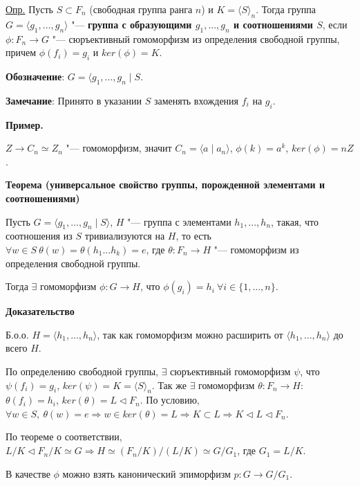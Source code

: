 \documentclass{article}
\begin{document}
\vspace{10pt}

\underline{Опр.} Пусть $S \subset F_n$ (свободная группа ранга $n$) и $K = \langle S \rangle_n$. Тогда группа $G = \langle g_1, ..., g_n \rangle$ "--- \textbf{группа с образующими $g_1, ..., g_n$ и соотношениями $S$}, если $\phi: F_n \rightarrow G$ "--- сюръективный гомоморфизм из определения свободной группы, причем $\phi(f_i) = g_i$ и $ker(\phi) = K$.

\textbf{Обозначение}: $G = \langle g_1, ..., g_n \mid S$.

\textbf{Замечание}: Принято в указании $S$ заменять вхождения $f_i$ на $g_i$.

\textbf{Пример.}

$Z \rightarrow C_n \simeq Z_n$ "--- гомоморфизм, значит $C_n = \langle a \mid a_n \rangle$, $\phi(k) = a^k$, $ker(\phi) = nZ$.

\vspace{10pt}

\textbf{Теорема (универсальное свойство группы, порожденной элементами и соотношениями)}

Пусть $G = \langle g_1 ,..., g_n \mid S \rangle$, $H$ "--- группа с элементами $h_1, ..., h_n$, такая, что соотношения из $S$ тривиализуются на $H$, то есть $\forall w \in S \  \theta(w) = \theta(h_1...h_k) = e$, где $\theta: F_n \rightarrow H$ "--- гомоморфизм из определения свободной группы.

Тогда $\exists$ гомоморфизм $\phi: G \rightarrow H$, что $\phi(g_i) = h_i \  \forall i \in \{1, ..., n\}$.

\textbf{Доказательство}

Б.о.о. $H = \langle h_1, ..., h_n \rangle$, так как гомоморфизм можно расширить от $\langle h_1, ..., h_n \rangle$ до всего $H$.

По определению свободной группы, $\exists$ сюръективный гомоморфизм $\psi$, что $\psi(f_i) = g_i$, $ker(\psi) = K = \langle S \rangle_n$. Так же $\exists$ гомоморфизм $\theta: F_n \rightarrow H$: $\theta(f_i) = h_i$, $ker(\theta) = L \triangleleft F_n$. По условию, $\forall w \in S, \  \theta(w) = e \Rightarrow w \in ker(\theta) = L \Rightarrow  K \subset L \Rightarrow K \triangleleft L \triangleleft F_n$.

По теореме о соответствии, $L/K \triangleleft F_n/K \simeq G \Rightarrow H \simeq (F_n/K)/(L/K) \simeq G/G_1$, где $G_1 = L/K$.

В качестве $\phi$ можно взять канонический эпиморфизм $p: G \rightarrow G/G_1$.
\end{document}
